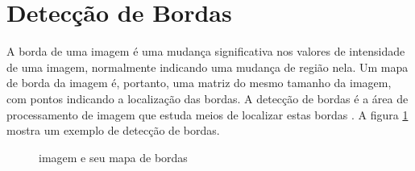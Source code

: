 \section{Detecção de Bordas} \label{met:borda}

A borda de uma imagem é uma mudança significativa nos valores de intensidade de uma imagem, normalmente indicando uma mudança de região nela. Um mapa de borda da imagem é, portanto, uma matriz do mesmo tamanho da imagem, com pontos indicando a localização das bordas. A detecção de bordas é a área de processamento de imagem que estuda meios de localizar estas bordas \cite{borda01}. A figura \ref{exemploborda} mostra um exemplo de detecção de bordas.



\begin{figure}[h]
  \centering
  \hfill
  \caption{imagem e seu mapa de bordas}
  \label{exemploborda}
\end{figure}


